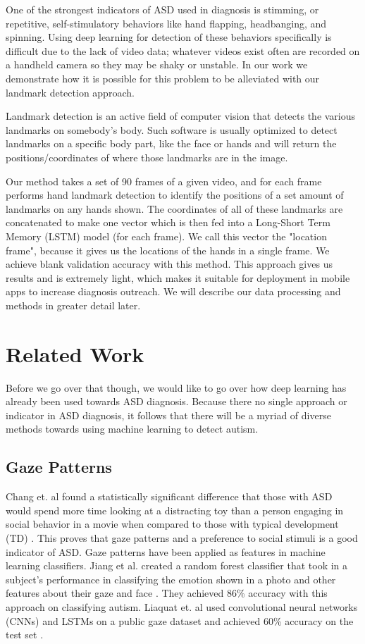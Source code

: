 \documentclass{article}
\begin{document}
One of the strongest indicators of ASD used in diagnosis is stimming, or repetitive, self-stimulatory behaviors like hand flapping, headbanging, and spinning. Using deep learning for detection of these behaviors specifically is difficult due to the lack of video data; whatever videos exist often are recorded on a handheld camera so they may be shaky or unstable. In our work we demonstrate how it is possible for this problem to be alleviated with our landmark detection approach.

Landmark detection is an active field of computer vision that detects the various landmarks on somebody’s body. Such software is usually optimized to detect landmarks on a specific body part, like the face or hands and will return the positions/coordinates of where those landmarks are in the image. 

Our method takes a set of 90 frames of a given video, and for each frame performs hand landmark detection to identify the positions of a set amount of landmarks on any hands shown. The coordinates of all of these landmarks are concatenated to make one vector which is then fed into a Long-Short Term Memory (LSTM) model \cite{hochreiter1997long} (for each frame). We call this vector the "location frame", because it gives us the locations of the hands in a single frame. We achieve blank validation accuracy with this method. This approach gives us results and is extremely light, which makes it suitable for deployment in mobile apps to increase diagnosis outreach. We will describe our data processing and methods in greater detail later. 

\section{Related Work}

Before we go over that though, we would like to go over how deep learning has already been used towards ASD diagnosis. Because there no single approach or indicator in ASD diagnosis, it follows that there will be a myriad of diverse methods towards using machine learning to detect autism. 

\subsection{Gaze Patterns}
Chang et. al found a statistically significant difference that those with ASD would spend more time looking at a distracting toy than a person engaging in social behavior in a movie when compared to those with typical development (TD) \cite{PMID:33900383}. This proves that gaze patterns and a preference to social stimuli is a good indicator of ASD. Gaze patterns have been applied as features in machine learning classifiers. Jiang et al. created a random forest classifier that took in a subject’s performance in classifying the emotion shown in a photo and other features about their gaze and face \cite{8857005}. They achieved 86\% accuracy with this approach on classifying autism.  Liaquat et. al used convolutional neural networks (CNNs) \cite{lecun1989backpropagation} and LSTMs on a public gaze dataset and achieved 60\% accuracy on the test set \cite{LIAQAT2021116198}. 
\end{document}

